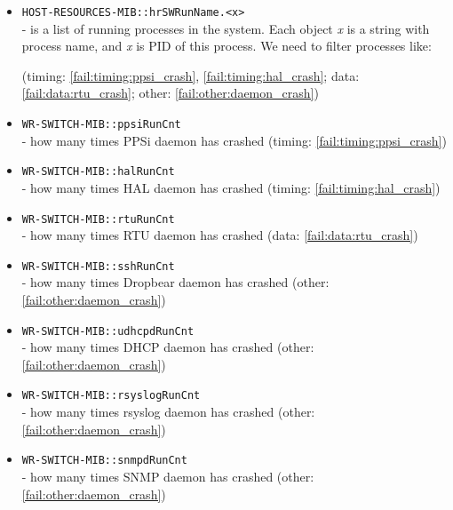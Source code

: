 \begin{itemize}[leftmargin=0pt]
	\item [] \texttt{HOST-RESOURCES-MIB::hrSWRunName.<x>}\\ - is a list of running
		processes in the system. Each object \emph{x} is a string with process name,
		and \emph{x} is PID of this process. We need to filter processes like:
		\vspace{12pt}
		(timing: \ref{fail:timing:ppsi_crash}, \ref{fail:timing:hal_crash}; data:
		\ref{fail:data:rtu_crash}; other: \ref{fail:other:daemon_crash})
	\item [] \texttt{WR-SWITCH-MIB::ppsiRunCnt}\\ - how many times PPSi daemon
		has crashed (timing: \ref{fail:timing:ppsi_crash})
	\item [] \texttt{WR-SWITCH-MIB::halRunCnt}\\ - how many times HAL daemon
		has crashed (timing: \ref{fail:timing:hal_crash})
	\item [] \texttt{WR-SWITCH-MIB::rtuRunCnt}\\ - how many times RTU daemon
		has crashed (data: \ref{fail:data:rtu_crash})
	\item [] \texttt{WR-SWITCH-MIB::sshRunCnt}\\ - how many times Dropbear
		daemon has crashed (other: \ref{fail:other:daemon_crash})
	\item [] \texttt{WR-SWITCH-MIB::udhcpdRunCnt}\\ - how many times DHCP daemon
		has crashed (other: \ref{fail:other:daemon_crash})
	\item [] \texttt{WR-SWITCH-MIB::rsyslogRunCnt}\\ - how many times rsyslog
		daemon has crashed (other: \ref{fail:other:daemon_crash})
	\item [] \texttt{WR-SWITCH-MIB::snmpdRunCnt}\\ - how many times SNMP daemon
		has crashed (other: \ref{fail:other:daemon_crash})

\end{itemize}
